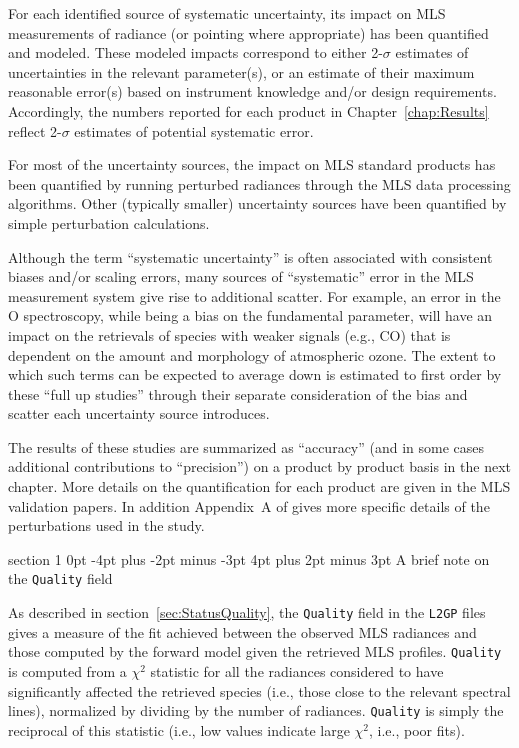\documentclass[11pt,draft]{report}
\makeatletter
\renewcommand{\section}{\@startsection%
  {section}%
  {1}%
  {0pt}%
  {-4pt plus -2pt minus -3pt}%
  {4pt plus 2pt minus 3pt}%
  {\Large\sffamily\fontseries{sb}\selectfont\flushleft\color{SectionColor}\figureversion{tabular}}}%
\makeatother
\begin{document}
For each identified source of systematic uncertainty, its impact on MLS
measurements of radiance (or pointing where appropriate) has been
quantified and modeled.  These modeled impacts correspond to either
2-$\sigma$ estimates of uncertainties in the relevant parameter(s), or
an estimate of their maximum reasonable error(s) based on instrument
knowledge and/or design requirements.  Accordingly, the numbers reported
for each product in Chapter~\ref{chap:Results} reflect 2-$\sigma$
estimates of potential systematic error.

For most of the uncertainty sources, the impact on MLS standard products
has been quantified by running perturbed radiances through the MLS data
processing algorithms.  Other (typically smaller) uncertainty sources
have been quantified by simple perturbation calculations.

Although the term ``systematic uncertainty'' is often associated with
consistent biases and/or scaling errors, many sources of ``systematic''
error in the MLS measurement system give rise to additional scatter.
For example, an error in the O spectroscopy, while being a bias on
the fundamental parameter, will have an impact on the retrievals of
species with weaker signals (e.g., CO) that is dependent on the amount
and morphology of atmospheric ozone.  The extent to which such terms can
be expected to average down is estimated to first order by these ``full
up studies'' through their separate consideration of the bias and scatter
each uncertainty source introduces.

The results of these studies are summarized as ``accuracy'' (and in some
cases additional contributions to ``precision'') on a product by product
basis in the next chapter.  More details on the quantification for each
product are given in the MLS validation papers.  In addition Appendix~A
of \citet{ReadEtal07} gives more specific details of the perturbations
used in the study.

\section{A brief note on the \texttt{Quality} field}

As described in section~\ref{sec:StatusQuality}, the \texttt{Quality}
field in the \texttt{L2GP} files gives a measure of the fit achieved
between the observed MLS radiances and those computed by the forward
model given the retrieved MLS profiles.  \texttt{Quality} is computed
from a $\chi^2$ statistic for all the radiances considered to have
significantly affected the retrieved species (i.e., those close to the
relevant spectral lines), normalized by dividing by the number of
radiances.  \texttt{Quality} is simply the reciprocal of this statistic
(i.e., low values indicate large $\chi^2$, i.e., poor fits).
\end{document}
